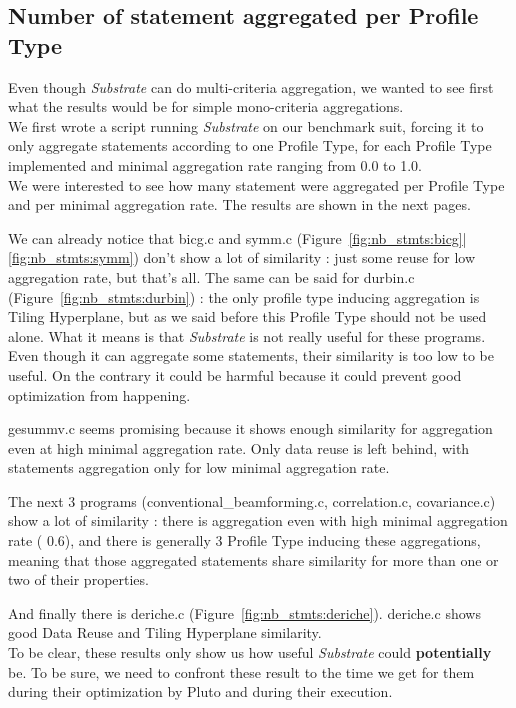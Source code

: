 \documentclass[paper=a4, fontsize=11.5pt]{scrartcl}
\numberwithin{equation}{section}        %
\numberwithin{figure}{section}          %
\numberwithin{table}{section}               %
\begin{document}
\subsection{Number of statement aggregated per Profile Type}
\label{sec:nb_stmt}

Even though \textit{Substrate} can do multi-criteria aggregation, we wanted to see first what
the results would be for simple mono-criteria aggregations.\\
We first wrote a script running \textit{Substrate} on our benchmark suit, forcing it to
only aggregate statements according to one Profile Type, for each Profile Type implemented
and minimal aggregation rate ranging from 0.0 to 1.0.\\

We were interested to see how many statement were aggregated per Profile Type and per minimal
aggregation rate. The results are shown in the next pages.

We can already notice that bicg.c and symm.c (Figure~\ref{fig:nb_stmts:bicg}|\ref{fig:nb_stmts:symm})
don't show a lot of similarity : just some reuse for low aggregation rate, but that's all.
The same can be said for durbin.c (Figure~\ref{fig:nb_stmts:durbin}) : the only profile type
inducing aggregation is Tiling Hyperplane, but as we said before this Profile Type should not
be used alone.
What it means is that \textit{Substrate} is not really useful for these programs. Even though
it can aggregate some statements, their similarity is too low to be useful. On the contrary
it could be harmful because it could prevent good optimization from happening.

gesummv.c seems promising because it shows enough similarity for aggregation even at high
minimal aggregation rate. Only data reuse is left behind, with statements aggregation only
for low minimal aggregation rate.

The next 3 programs (conventional\_beamforming.c, correlation.c, covariance.c) show a lot of
similarity : there is aggregation even with high minimal aggregation rate ( 0.6), and
there is generally 3 Profile Type inducing these aggregations, meaning that those aggregated 
statements share similarity for more than one or two of their properties.

And finally there is deriche.c (Figure~\ref{fig:nb_stmts:deriche}). deriche.c shows good
Data Reuse and Tiling Hyperplane similarity.\\

To be clear, these results only show us how useful \textit{Substrate} could \textbf{potentially} be.
To be sure, we need to confront these result to the time we get for them during their optimization by Pluto
and during their execution.
\end{document}
